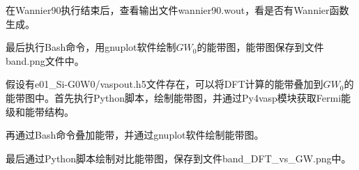 在\textrm{Wannier90}执行结束后，查看输出文件\textrm{wannier90.wout}，看是否有\textrm{Wannier}函数生成。

最后执行\textrm{Bash}命令，用\textrm{gnuplot}软件绘制$GW_0$的能带图，能带图保存到文件\textrm{band.png}文件中。

假设有\textrm{e01\_Si-G0W0/vaspout.h5}文件存在，可以将\textrm{DFT}计算的能带叠加到$GW_0$的能带图中。首先执行\textrm{Python}脚本，绘制能带图，并通过\textrm{Py4vasp}模块获取\textrm{Fermi}能级和能带结构。

再通过\textrm{Bash}命令叠加能带，并通过\textrm{gnuplot}软件绘制能带图。

最后通过\textrm{Python}脚本绘制对比能带图，保存到文件\textrm{band\_DFT\_vs\_GW.png}中。
